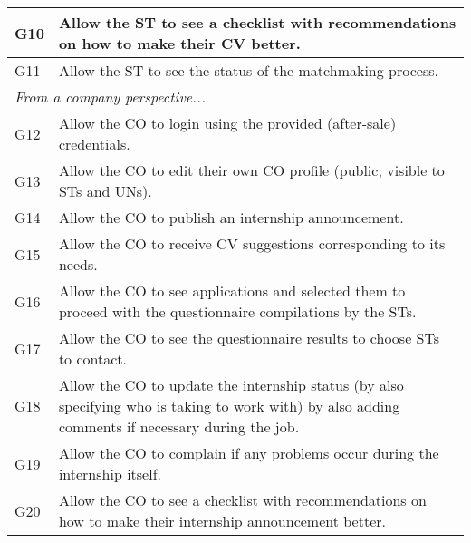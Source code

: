 \begin{table}[H]
\begin{longtable}{|l|p{}|}
        \hline
        G10           & Allow the ST to see a checklist with recommendations on how to make their CV better.                                                              \\
        \hline
        G11           & Allow the ST to see the status of the matchmaking process.                                                                                        \\
        \hline \hline
        \multicolumn{2}{|l|}{\textit{From a company perspective...}}                                                                                                      \\
        \hline
        G12           & Allow the CO to login using the provided (after-sale) credentials.                                                                                \\
        \hline
        G13           & Allow the CO to edit their own CO profile (public, visible to STs and UNs).                                                                       \\
        \hline
        G14           & Allow the CO to publish an internship announcement.                                                                                               \\
        \hline
        G15           & Allow the CO to receive CV suggestions corresponding to its needs.                                                                                \\
        \hline
        G16           & Allow the CO to see applications and selected them to proceed with the questionnaire compilations by the STs.                                     \\
        \hline
        G17           & Allow the CO to see the questionnaire results to choose STs to contact.                                                                           \\
        \hline
        G18           & Allow the CO to update the internship status (by also specifying who is taking to work with) by also adding comments if necessary during the job. \\
        \hline
        G19           & Allow the CO to complain if any problems occur during the internship itself.                                                                      \\
        \hline
        G20           & Allow the CO to see a checklist with recommendations on how to make their internship announcement better.                                         \\

\end{longtable}
\end{table}
